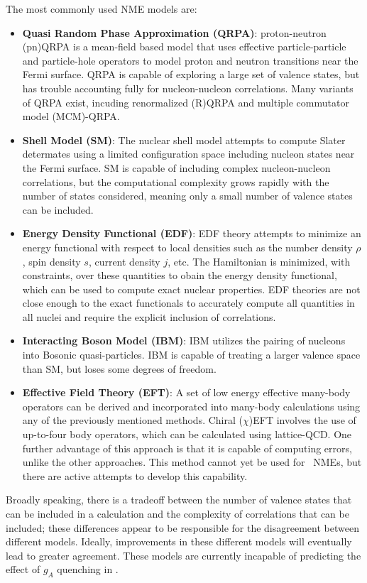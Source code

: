 \documentclass[/main.tex]{subfiles}
\begin{document}
The most commonly used NME models are:
\begin{itemize}
\item \textbf{Quasi Random Phase Approximation (QRPA)}: proton-neutron (pn)QRPA is a mean-field based model that uses effective particle-particle and particle-hole operators to model proton and neutron transitions near the Fermi surface.
  QRPA is capable of exploring a large set of valence states, but has trouble accounting fully for nucleon-nucleon correlations.
  Many variants of QRPA exist, incuding renormalized (R)QRPA and multiple commutator model (MCM)-QRPA.
\item \textbf{Shell Model (SM)}: The nuclear shell model attempts to compute Slater determates using a limited configuration space including nucleon states near the Fermi surface.
  SM is capable of including complex nucleon-nucleon correlations, but the computational complexity grows rapidly with the number of states considered, meaning only a small number of valence states can be included.
\item \textbf{Energy Density Functional (EDF)}: EDF theory attempts to minimize an energy functional with respect to local densities such as the number density $\rho$, spin density $s$, current density $j$, etc.
  The Hamiltonian is minimized, with constraints, over these quantities to obain the energy density functional, which can be used to compute exact nuclear properties.
  EDF theories are not close enough to the exact functionals to accurately compute all quantities in all nuclei and require the explicit inclusion of correlations.
\item \textbf{Interacting Boson Model (IBM)}: IBM utilizes the pairing of nucleons into Bosonic quasi-particles.
  IBM is capable of treating a larger valence space than SM, but loses some degrees of freedom.
\item \textbf{Effective Field Theory (EFT)}: A set of low energy effective many-body operators can be derived and incorporated into many-body calculations using any of the previously mentioned methods.
  Chiral ($\chi$)EFT involves the use of up-to-four body operators, which can be calculated using lattice-QCD.
  One further advantage of this approach is that it is capable of computing errors, unlike the other approaches.
  This method cannot yet be used for \znbb\ NMEs, but there are active attempts to develop this capability.
\end{itemize}
Broadly speaking, there is a tradeoff between the number of valence states that can be included in a calculation and the complexity of correlations that can be included; these differences appear to be responsible for the disagreement between different models.
Ideally, improvements in these different models will eventually lead to greater agreement.
These models are currently incapable of predicting the effect of $g_A$ quenching in \znbb.
\end{document}
